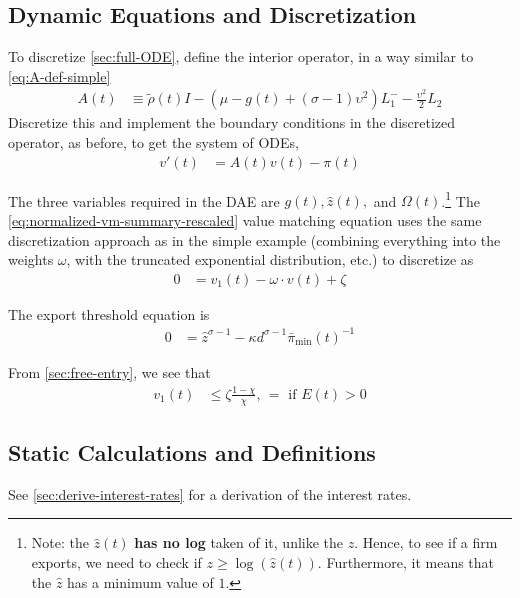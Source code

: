 \documentclass[11pt]{article}
\begin{document}
\subsection{Dynamic Equations and Discretization}
To discretize \cref{sec:full-ODE}, define the interior operator, in a way similar to \cref{eq:A-def-simple}
\begin{align}
	A(t) &\equiv \tilde{\rho}(t) I - (\mu - g(t) + (\sigma - 1)\upsilon^2) L^{-}_1 - \frac{\upsilon^2}{2} L_2\label{eq:A-def-full}
	\end{align}
Discretize this and implement the boundary conditions in the discretized operator, as before, to get the system of ODEs,
\begin{align}
	v'(t) &= A(t) v(t) - \pi(t)
\end{align}	

The three variables required in the DAE are $g(t), \hat{z}(t),$ and $\Omega(t)$.\footnote{Note: the $\hat{z}(t)$ \textbf{has no log} taken of it, unlike the $z$.  Hence, to see if a firm exports, we need to check if $z \geq \log(\hat{z}(t))$.  Furthermore, it means that the $\hat{z}$ has a minimum value of $1$.}  The \cref{eq:normalized-vm-summary-rescaled} value matching equation uses the same discretization approach as in the simple example (combining everything into the weights $\omega$, with the truncated exponential distribution, etc.) to discretize as
\begin{align}
	0 &= v_1(t) - \omega \cdot v(t) + \zeta
\end{align}

The export threshold equation is
\begin{align}
	0&=\hat{z}^{\sigma-1}-  \kappa d^{\sigma - 1} \bar{\pi}_{\min}(t)^{-1}\label{eq:z-hat-power}
\end{align}

From \cref{sec:free-entry}, we see that
\begin{align}
	v_1(t) &\leq \zeta \frac{1-\chi}{\chi},\, = \text{ if } E(t) > 0
\end{align}


\subsection{Static Calculations and Definitions}
See \cref{sec:derive-interest-rates} for a derivation of the interest rates.
\end{document}
